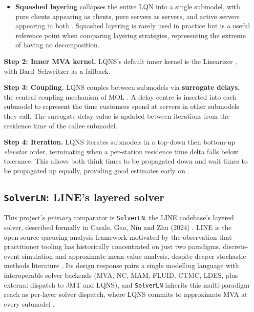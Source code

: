 \begin{itemize}
\item \textbf{Squashed layering} collapses the entire LQN into a single submodel, with pure clients appearing as clients, pure servers as servers, and active servers appearing in both \cite{franks99}. Squashed layering is rarely used in practice but is a useful reference point when comparing layering strategies, representing the extreme of having no decomposition.
\end{itemize}

\textbf{Step 2: Inner MVA kernel.} LQNS's default inner kernel is the Linearizer \cite{chandy82}, with Bard–Schweitzer as a fallback.

\textbf{Step 3: Coupling.} LQNS couples between submodels via \textbf{surrogate delays}, the central coupling mechanism of MOL \cite{rolia95}. A delay centre is inserted into each submodel to represent the time customers spend at servers in other submodels they call. The surrogate delay value is updated between iterations from the residence time of the callee submodel.

\textbf{Step 4: Iteration.} LQNS iterates submodels in a top-down then bottom-up \textit{elevator} order, terminating when a per-station residence time delta falls below tolerance. This allows both think times to be propagated down and wait times to be propagated up equally, providing good estimates early on \cite{franks99}.

\subsection{\texttt{SolverLN}: LINE's layered solver}
\label{sec:lqn-solverln}

This project's \textit{primary} comparator is \texttt{SolverLN}, the LINE codebase's layered solver, described formally in Casale, Gao, Niu and Zhu (2024) \cite{casale2024}. LINE is the open-source queueing analysis framework motivated by the observation that practitioner tooling has historically concentrated on just two paradigms, discrete-event simulation and approximate mean-value analysis, despite deeper stochastic-methods literature \cite{casale2020wsc}. Its design response pairs a single modelling language with interoperable solver backends (MVA, NC, MAM, FLUID, CTMC, LDES, plus external dispatch to JMT and LQNS), and \texttt{SolverLN} inherits this multi-paradigm reach as per-layer solver dispatch, where LQNS commits to approximate MVA at every submodel \cite{casale2024}.

